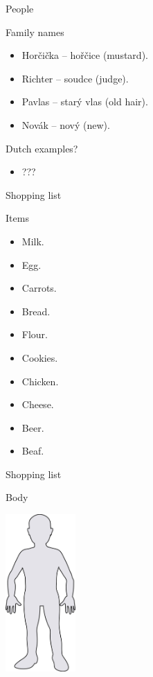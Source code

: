\begin{frame}{People}
  \begin{block}{Family names}
    \begin{itemize}
      \item Horčička -- hořčice (mustard). 
      \item Richter -- soudce (judge).
      \item Pavlas -- starý vlas (old hair).
      \item Novák -- nový (new).
    \end{itemize}
  \end{block}
  \begin{block}{Dutch examples?}
    \begin{itemize}
      \item ???
    \end{itemize}
  \end{block}
\end{frame}

\begin{frame}{Shopping list}
  \begin{block}{Items}
    \begin{itemize}
      \item Milk.
      \item Egg.
      \item Carrots.
      \item Bread.
      \item Flour.
      \item Cookies.
      \item Chicken. 
      \item Cheese.
      \item Beer. 
      \item Beaf.
    \end{itemize}
  \end{block}
  \begin{center}
  \end{center}
\end{frame}

\begin{frame}{Shopping list}
  \begin{block}{Body}
    \begin{center}
      \includegraphics[height=6cm]{img/body/body.jpg}
    \end{center}
  \end{block}
\end{frame}

